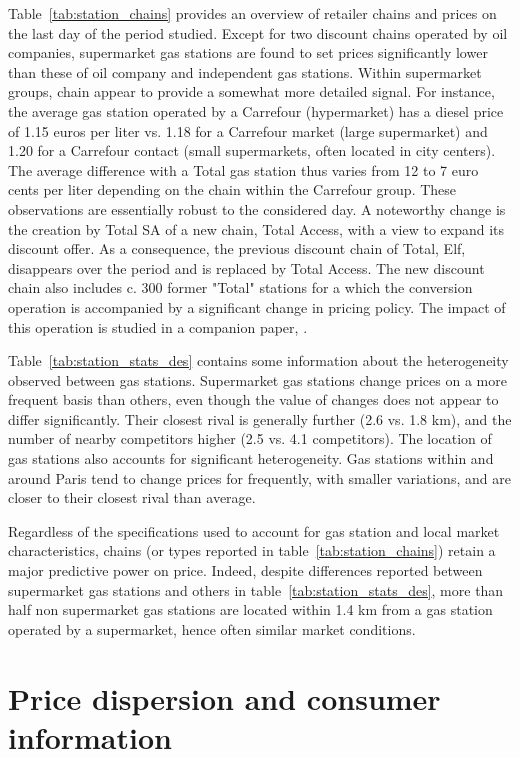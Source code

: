 \documentclass[english]{article}
\begin{document}
Table~\ref{tab:station_chains} provides an overview of retailer chains and prices on the last day of the period studied. Except for two discount chains operated by oil companies, supermarket gas stations are found to set prices significantly lower than these of oil company and independent gas stations. Within supermarket groups, chain appear to provide a somewhat more detailed signal. For instance, the average gas station operated by a Carrefour (hypermarket) has a diesel price of 1.15 euros per liter vs. 1.18 for a Carrefour market (large supermarket) and 1.20 for a Carrefour contact (small supermarkets, often located in city centers). The average difference with a Total gas station thus varies from 12 to 7 euro cents per liter depending on the chain within the Carrefour group. These observations are essentially robust to the considered day. A noteworthy change is the creation by Total SA of a new chain, Total Access, with a view to expand its discount offer. As a consequence, the previous discount chain of Total, Elf, disappears over the period and is replaced by Total Access. The new discount chain also includes c. 300 former "Total" stations for a which the conversion operation is accompanied by a significant change in pricing policy. The impact of this operation is studied in a companion paper, \cite{CHA16}.

Table~\ref{tab:station_stats_des} contains some information about the heterogeneity observed between gas stations. Supermarket gas stations change prices on a more frequent basis than others, even though the value of changes does not appear to differ significantly. Their closest rival is generally further (2.6 vs. 1.8 km), and the number of nearby competitors higher (2.5 vs. 4.1 competitors). The location of gas stations also accounts for significant heterogeneity. Gas stations within and around Paris tend to change prices for frequently, with smaller variations, and are closer to their closest rival than average.

Regardless of the specifications used to account for gas station and local market characteristics, chains (or types reported in table~\ref{tab:station_chains}) retain a major predictive power on price. Indeed, despite differences reported between supermarket gas stations and others in table~\ref{tab:station_stats_des}, more than half non supermarket gas stations are located within 1.4 km from a gas station operated by a supermarket, hence often similar market conditions.

\section{Price dispersion and consumer information}
\end{document}
